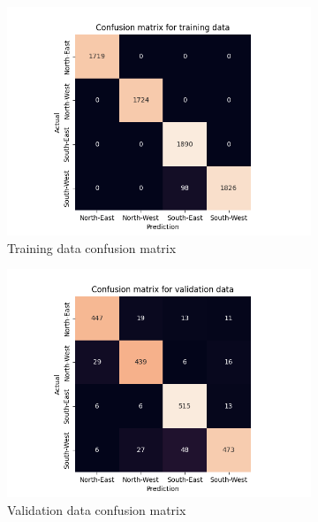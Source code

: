 \documentclass[10pt,twocolumn,letterpaper]{article}
\begin{document}
\begin{figure}
  \centering
  \begin{subfigure}{.33\linewidth}
    \includegraphics[width=\linewidth, trim={7em, 0em, 9em, 5em}, clip]{cnn_aug_cfsn_train}
    \caption{Training data confusion matrix}
    \label{fig:cnn_train}
  \end{subfigure}
  \begin{subfigure}{0.33\linewidth}
    \includegraphics[width=\linewidth, trim={7em, 0em, 9em, 5em}, clip]{cnn_aug_cfsn_valid}
    \caption{Validation data confusion matrix}
    \label{fig:cnn_valid}
  \end{subfigure}
  \begin{subfigure}{0.33\linewidth}

\end{subfigure}
\end{figure}
\end{document}
